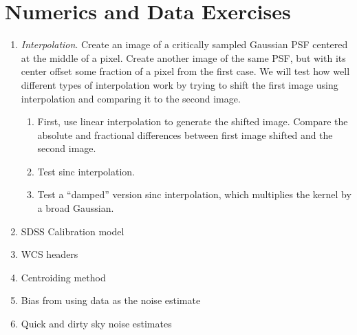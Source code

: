\section{Numerics and Data Exercises}

\begin{enumerate}
\item {\it Interpolation}. Create an image of a critically sampled
    Gaussian PSF centered at the middle of a pixel. Create another
    image of the same PSF, but with its center offset some fraction of
    a pixel from the first case. We will test how well different types
    of interpolation work by trying to shift the first image using
    interpolation and comparing it to the second image.
\begin{enumerate}
\item First, use linear interpolation to generate the shifted
    image. Compare the absolute and fractional differences between
    first image shifted and the second image.

\item
    Test sinc interpolation.  \item Test a ``damped'' version sinc
    interpolation, which multiplies the kernel by a broad
    Gaussian.  \end{enumerate}
\item SDSS Calibration model
\item WCS headers
\item Centroiding method
\item Bias from using data as the noise estimate
\item Quick and dirty sky noise estimates
\end{enumerate}


  
